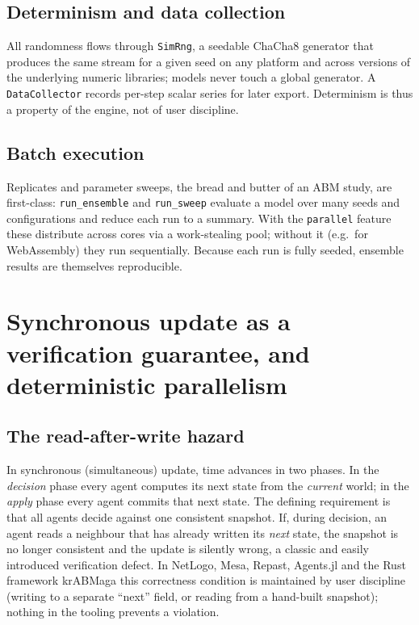 \documentclass[review]{elsarticle}
\begin{document}
\subsection{Determinism and data collection}
All randomness flows through \texttt{SimRng}, a seedable ChaCha8 generator
\cite{bernstein2008chacha} that produces the same stream for a given seed on
any platform and across versions of the underlying numeric libraries; models
never touch a global generator. A \texttt{DataCollector} records per-step
scalar series for later export. Determinism is thus a property of the engine,
not of user discipline.

\subsection{Batch execution}
Replicates and parameter sweeps, the bread and butter of an ABM study, are
first-class: \texttt{run\_ensemble} and \texttt{run\_sweep} evaluate a model
over many seeds and configurations and reduce each run to a summary. With the
\texttt{parallel} feature these distribute across cores via a work-stealing
pool; without it (e.g.\ for WebAssembly) they run sequentially. Because each run
is fully seeded, ensemble results are themselves reproducible.

\section{Synchronous update as a verification guarantee, and deterministic parallelism}
\label{sec:sync}

\subsection{The read-after-write hazard}
In synchronous (simultaneous) update, time advances in two phases. In the
\emph{decision} phase every agent computes its next state from the
\emph{current} world; in the \emph{apply} phase every agent commits that next
state. The defining requirement is that all agents decide against one
consistent snapshot. If, during decision, an agent reads a neighbour that has
already written its \emph{next} state, the snapshot is no longer consistent and
the update is silently wrong, a classic and easily introduced verification
defect. In NetLogo, Mesa, Repast, Agents.jl and the Rust framework krABMaga
\cite{antelmi2024krabmaga} this correctness condition is maintained by user
discipline (writing to a separate ``next'' field, or reading from a hand-built
snapshot); nothing in the tooling prevents a violation.
\end{document}
